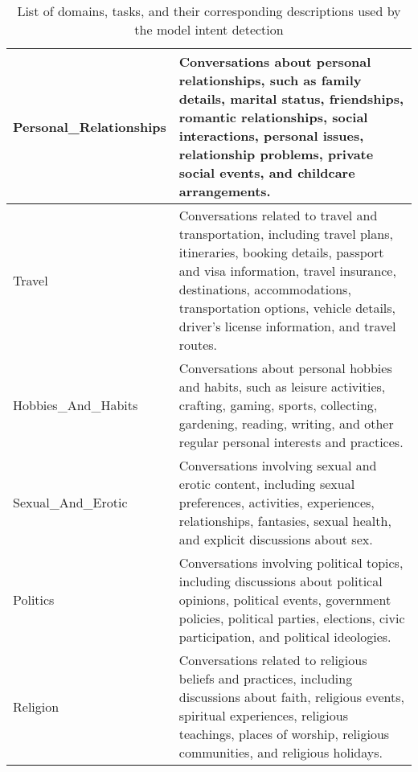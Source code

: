 \begin{table*}[ht]
\begin{tabular}{|p{3.5cm}|p{10cm}|}
Personal\_Relationships & Conversations about personal relationships, such as family details, marital status, friendships, romantic relationships, social interactions, personal issues, relationship problems, private social events, and childcare arrangements. \\ \hline
Travel & Conversations related to travel and transportation, including travel plans, itineraries, booking details, passport and visa information, travel insurance, destinations, accommodations, transportation options, vehicle details, driver's license information, and travel routes. \\ \hline
Hobbies\_And\_Habits & Conversations about personal hobbies and habits, such as leisure activities, crafting, gaming, sports, collecting, gardening, reading, writing, and other regular personal interests and practices. \\ \hline
Sexual\_And\_Erotic & Conversations involving sexual and erotic content, including sexual preferences, activities, experiences, relationships, fantasies, sexual health, and explicit discussions about sex. \\ \hline
Politics & Conversations involving political topics, including discussions about political opinions, political events, government policies, political parties, elections, civic participation, and political ideologies. \\ \hline
Religion & Conversations related to religious beliefs and practices, including discussions about faith, religious events, spiritual experiences, religious teachings, places of worship, religious communities, and religious holidays. \\ \hline
\end{tabular}
\caption{List of domains, tasks, and their corresponding descriptions used by the model intent detection}
\label{tab:categories}
\end{table*}
